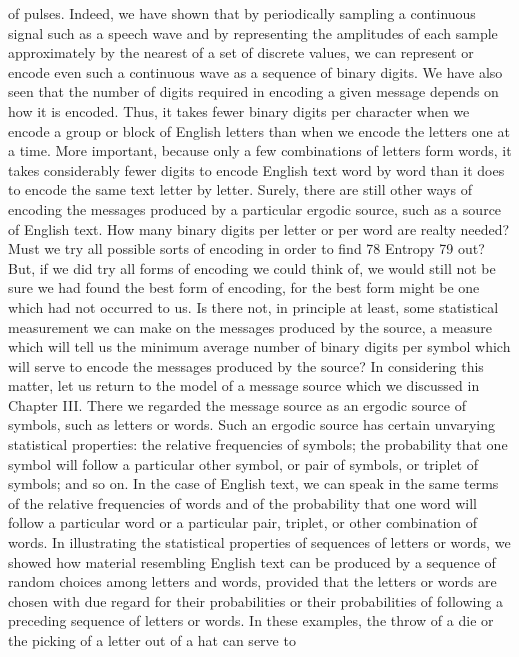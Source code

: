 of pulses.
Indeed, we have shown that by periodically sampling a continuous
signal such as a speech wave and by representing the amplitudes
of each sample approximately by the nearest of a set of
discrete values, we can represent or encode even such a continuous
wave as a sequence of binary digits.
We have also seen that the number of digits required in encoding
a given message depends on how it is encoded. Thus, it takes fewer
binary digits per character when we encode a group or block of
English letters than when we encode the letters one at a time.
More important, because only a few combinations of letters form
words, it takes considerably fewer digits to encode English text
word by word than it does to encode the same text letter by letter.
Surely, there are still other ways of encoding the messages produced
by a particular ergodic source, such as a source of English
text. How many binary digits per letter or per word are realty
needed? Must we try all possible sorts of encoding in order to find
78
Entropy 79
out? But, if we did try all forms of encoding we could think of, we
would still not be sure we had found the best form of encoding,
for the best form might be one which had not occurred to us.
Is there not, in principle at least, some statistical measurement
we can make on the messages produced by the source, a measure
which will tell us the minimum average number of binary digits
per symbol which will serve to encode the messages produced by
the source?
In considering this matter, let us return to the model of a message
source which we discussed in Chapter III. There we regarded
the message source as an ergodic source of symbols, such as letters
or words. Such an ergodic source has certain unvarying statistical
properties: the relative frequencies of symbols; the probability that
one symbol will follow a particular other symbol, or pair of symbols,
or triplet of symbols; and so on.
In the case of English text, we can speak in the same terms of
the relative frequencies of words and of the probability that one
word will follow a particular word or a particular pair, triplet, or
other combination of words.
In illustrating the statistical properties of sequences of letters or
words, we showed how material resembling English text can be
produced by a sequence of random choices among letters and
words, provided that the letters or words are chosen with due
regard for their probabilities or their probabilities of following a
preceding sequence of letters or words. In these examples, the
throw of a die or the picking of a letter out of a hat can serve to
